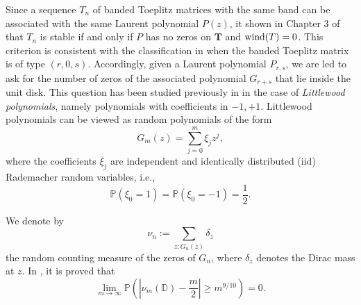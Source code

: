 \documentclass[12pt]{amsart}
\theoremstyle{plain}
\numberwithin{equation}{section}
\renewcommand{\Pr}{\mathbb{P}}
\newcommand{\<}{\langle}
\renewcommand{\>}{\rangle}
\newcommand{\abs}[1]{\left|#1\right|}
\renewcommand{\Pr}[1]{\mathds{P}\left(#1\right)}
\begin{document}
Since a sequence ${T_n}$ of banded Toeplitz matrices with the same band can be associated with the same Laurent polynomial $P(z)$, it shown in Chapter 3 of \cite{bottcher2005spectral} that ${T_n}$ is stable if and only if $P$ has no zeros on $\mathbf{T}$ and $\textnormal{wind}(T)=0$. This criterion is consistent with the classification in \cite{amodio1996conditioning} when the banded Toeplitz matrix is of type $(r,0,s)$. Accordingly, given a Laurent polynomial $P_{r,s}$, we are led to ask for the number of zeros of the associated polynomial $G_{r+s}$ that lie inside the unit disk. This question has been studied previously in \cite{yakir2021approximately} in the case of {\it Littlewood polynomials}, namely polynomials with coefficients in ${-1,+1}$. Littlewood polynomials can be viewed as random polynomials of the form
\[
G_m(z) = \sum_{j=0}^{m} \xi_j z^j,
\]
where the coefficients $\xi_j$ are independent and identically distributed (iid) Rademacher random variables, i.e.,
\[
\Pr{\xi_0 = 1} = \Pr{\xi_0 = -1} = \frac{1}{2}.
\]

We denote by  
\[
\nu_n := \sum_{z:G_n(z)} \delta_z
\]
the random counting measure of the zeros of $G_n$, where $\delta_z$ denotes the Dirac mass at $z$. In \cite{yakir2021approximately}, it is proved that 
\begin{equation}\label{eqn:main.expression}
\lim_{m\to\infty} \Pr{\abs{\nu_m(\mathds{D}) - \frac{m}{2}} \geq m^{9/10}} = 0.
\end{equation}
\end{document}
